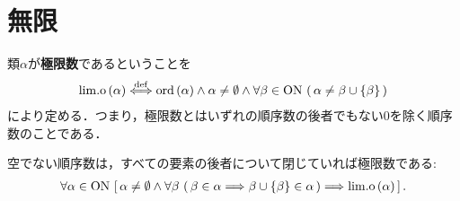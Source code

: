 \section{無限}
	\begin{screen}
		\begin{dfn}[極限数]
			類$\alpha$が{\bf 極限数}であるということを
			\begin{align}
				\mathrm{lim.o}\left(\alpha\right) \overset{\mathrm{def}}{\Longleftrightarrow} \operatorname*{ord} \left(\alpha\right) \wedge \alpha \neq \emptyset
				\wedge \forall \beta \in \mathrm{ON}\, \left(\, \alpha \neq \beta \cup \{\beta\}\, \right)
			\end{align}
			により定める．つまり，極限数とはいずれの順序数の後者でもない$0$を除く順序数のことである．
		\end{dfn}
	\end{screen}
	
	\begin{screen}
		\begin{thm}[全ての要素の後者で閉じていれば極限数]\label{thm:if_closed_for_latter_then_limit_ordinal}
			空でない順序数は，すべての要素の後者について閉じていれば極限数である:
			\begin{align}
				\forall \alpha \in \mathrm{ON}\,
				\left[\, \alpha \neq \emptyset \wedge 
				\forall \beta\, \left(\, \beta \in \alpha \Longrightarrow \beta \cup \{\beta\} \in \alpha\, \right)
				\Longrightarrow \mathrm{lim.o}\left(\alpha\right)\, \right].
			\end{align}
		\end{thm}
	\end{screen}
	
